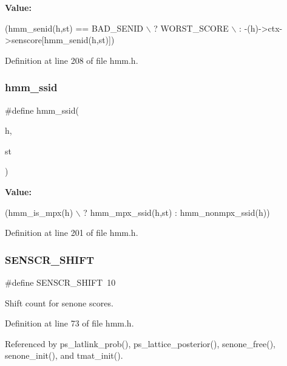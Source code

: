 {\bfseries Value\+:}
\begin{DoxyCode}
(hmm\_senid(h,st) == BAD_SENID                  \(\backslash\)
                          ? WORST_SCORE                                 \(\backslash\)
                          : -(h)->ctx->senscore[hmm\_senid(h,st)])
\end{DoxyCode}


Definition at line 208 of file hmm.\+h.

\mbox{\label{hmm_8h_a373c24cfb5d5e2d732b0b88f716c0d55}} 
\subsubsection{hmm\+\_\+ssid}
{\footnotesize\ttfamily \#define hmm\+\_\+ssid(\begin{DoxyParamCaption}\item[{}]{h,  }\item[{}]{st }\end{DoxyParamCaption})}

{\bfseries Value\+:}
\begin{DoxyCode}
(hmm\_is\_mpx(h)                                   \(\backslash\)
                        ? hmm\_mpx\_ssid(h,st) : hmm\_nonmpx\_ssid(h))
\end{DoxyCode}


Definition at line 201 of file hmm.\+h.

\mbox{\label{hmm_8h_af94da16e3e5b550b9be05b0f07402cc7}} 
\subsubsection{S\+E\+N\+S\+C\+R\+\_\+\+S\+H\+I\+FT}
{\footnotesize\ttfamily \#define S\+E\+N\+S\+C\+R\+\_\+\+S\+H\+I\+FT~10}



Shift count for senone scores. 



Definition at line 73 of file hmm.\+h.



Referenced by ps\+\_\+latlink\+\_\+prob(), ps\+\_\+lattice\+\_\+posterior(), senone\+\_\+free(), senone\+\_\+init(), and tmat\+\_\+init().

\mbox{\label{hmm_8h_a833f100ee293ad0f1c03f2a5ef9be77a}} 
